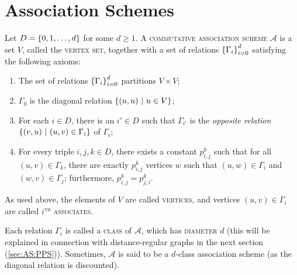 \documentclass{report}
\newcommand{\AS}{\mathcal{A}}
\begin{document}
  \section{Association Schemes}\label{sec:AS:AS}

    \begin{defn}
      \label{association-scheme-comb}
      Let $D = \left\lbrace 0, 1, \ldots, d \right\rbrace$ for some $d \geq 1$.
      A \textsc{commutative association scheme} $\AS$ is a set $V$, called the
      \textsc{vertex set}, together with a set of relations $\left\lbrace \Gamma_i \right\rbrace_{i=0}^d$
      satisfying the following axioms:
      \begin{enumerate}
        \item The set of relations $\left\lbrace \Gamma_i \right\rbrace_{i=0}^d$ partitions $V \times
          V$;
          \label{cAS-part}
        \item $\Gamma_0$ is the diagonal relation $\left\lbrace  (u, u) \ \middle| \ u \in V  \right\rbrace$;
          \label{cAS-diag}
        \item For each $i \in D$, there is an $i' \in D$ such that $\Gamma_{i'}$ is
          the \textit{opposite relation} $\left\lbrace  (v, u) \ \middle| \ (u, v) \in \Gamma_i  \right\rbrace$ of
          $\Gamma_i$;
          \label{cAS-sym}
        \item For every triple $i, j, k \in D$, there exists a constant $p_{i,
          j}^k$ such that for all $(u, v) \in \Gamma_k$, there are exactly $p_{i,
          j}^k$ vertices $w$ such that $(u, w) \in \Gamma_i$ and $(w, v) \in
          \Gamma_j$;
          furthermore, $p_{i, j}^k = p_{j, i}^k$.
          \label{cAS-reg}
      \end{enumerate}

      As used above, the elements of $V$ are called \textsc{vertices},
      and vertices $(u, v) \in \Gamma_i$ are called \textsc{$i^\text{th}$ associates}.

      Each relation $\Gamma_i$ is called a \textsc{class} of $\AS$, which has
      \textsc{diameter} $d$ (this will be explained in connection with
      distance-regular graphs in the next section (\ref{sec:AS:PPS})).
      Sometimes, $\AS$ is said to be a $d$-class association scheme (as the
      diagonal relation is discounted).
    \end{defn}
\end{document}
